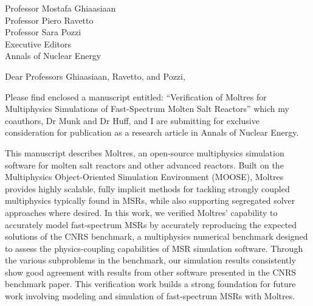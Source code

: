 \documentclass[11pt]{letter} %
\begin{document}


\begin{letter}{Professor Mostafa Ghiaasiaan\\
Professor Piero Ravetto\\
Professor Sara Pozzi\\
Executive Editors\\
Annals of Nuclear Energy}


\address{Sun Myung Park\\
University of Illinois\\
226 Talbot Laboratory\\
MC-234\\
104 S. Wright Street\\
Urbana, IL 61801}




\opening{Dear Professors Ghiaasiaan, Ravetto, and Pozzi,}

Please find enclosed a manuscript entitled: ``Verification of Moltres for
Multiphysics Simulations of Fast-Spectrum Molten Salt Reactors'' which my
coauthors, Dr Munk and Dr Huff, and I are submitting for exclusive
consideration for publication as a research article in Annals of Nuclear
Energy.

This manuscript describes Moltres, an open-source multiphysics simulation
software for molten salt reactors and other advanced reactors.
Built on the Multiphysics Object-Oriented Simulation
Environment (MOOSE), Moltres provides highly scalable, fully implicit methods
for tackling strongly coupled multiphysics typically found in MSRs, while also
supporting segregated solver approaches where desired. In this work,
we verified Moltres' capability to accurately model fast-spectrum MSRs by
accurately reproducing the expected solutions of the CNRS benchmark, a
multiphysics numerical benchmark designed to assess the physics-coupling
capabilities of MSR simulation software. Through the various subproblems in the
benchmark, our simulation results consistently show good agreement with
results from other software presented in the CNRS benchmark paper. This
verification work builds a strong foundation for future work involving
modeling and simulation of fast-spectrum MSRs with Moltres.


\end{letter}
\end{document}
